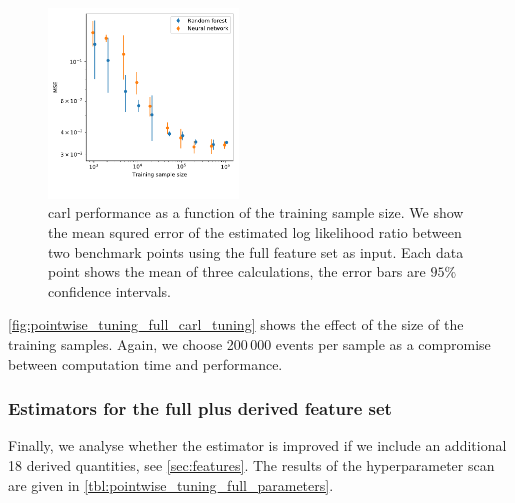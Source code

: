\begin{figure}
  \includegraphics[width=0.45\textwidth]{figures/appendix/pointwise_tuning_full/mse_full_training_sample_size.pdf}%
  \caption{carl performance as a function of the training sample size.
    We show the mean squred error of the estimated log likelihood
    ratio between two benchmark points using the full feature set as
    input. Each data point shows the mean of three calculations, the
    error bars are $95\%$ confidence intervals.}
  \label{fig:pointwise_tuning_full_carl_tuning}
\end{figure}

\autoref{fig:pointwise_tuning_full_carl_tuning} shows the effect of
the size of the training samples.  Again, we choose 200\,000 events
per sample as a compromise between computation time and performance.




\subsubsection*{Estimators for the full plus derived feature set}

Finally, we analyse whether the estimator is improved if we include an
additional 18 derived quantities, see \autoref{sec:features}. The
results of the hyperparameter scan are given in
\autoref{tbl:pointwise_tuning_full_parameters}.


